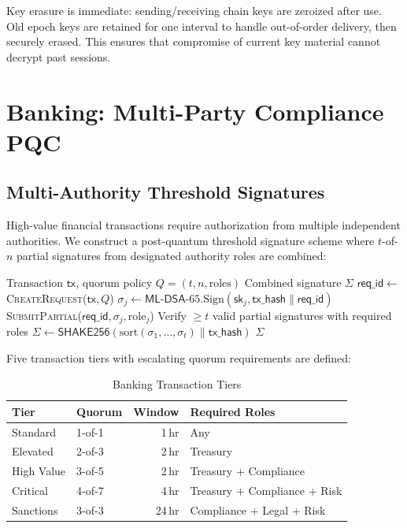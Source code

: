 \documentclass[conference,10pt]{IEEEtran}
\newcommand{\mldsa}{\textsf{ML-DSA}}
\newcommand{\shake}{\textsf{SHAKE256}}
\begin{document}
Key erasure is immediate: sending/receiving chain keys are zeroized after use. Old epoch keys are retained for one interval to handle out-of-order delivery, then securely erased. This ensures that compromise of current key material cannot decrypt past sessions.

\section{Banking: Multi-Party Compliance PQC}
\label{sec:banking}

\subsection{Multi-Authority Threshold Signatures}

High-value financial transactions require authorization from multiple independent authorities. We construct a post-quantum threshold signature scheme where $t$-of-$n$ partial signatures from designated authority roles are combined:

\begin{algorithm}[t]
\caption{Multi-Authority Threshold Signing}
\label{alg:threshold}
\begin{algorithmic}[1]
\REQUIRE Transaction $\mathsf{tx}$, quorum policy $Q = (t, n, \text{roles})$
\ENSURE Combined signature $\Sigma$
\STATE $\mathsf{req\_id} \leftarrow$ \textsc{CreateRequest}($\mathsf{tx}, Q$)
    \STATE $\sigma_j \leftarrow \mldsa\text{-65.Sign}(\mathsf{sk}_j, \mathsf{tx\_hash} \| \mathsf{req\_id})$
    \STATE \textsc{SubmitPartial}($\mathsf{req\_id}, \sigma_j, \text{role}_j$)
\ENDFOR
\STATE Verify $\geq t$ valid partial signatures with required roles
\STATE $\Sigma \leftarrow \shake{}(\text{sort}(\sigma_1, \ldots, \sigma_t) \| \mathsf{tx\_hash})$
\RETURN $\Sigma$
\end{algorithmic}
\end{algorithm}

Five transaction tiers with escalating quorum requirements are defined:

\begin{table}[t]
\centering
\caption{Banking Transaction Tiers}
\label{tab:tiers}
\begin{tabular}{llrl}
\toprule
\textbf{Tier} & \textbf{Quorum} & \textbf{Window} & \textbf{Required Roles} \\
\midrule
Standard & 1-of-1 & 1\,hr & Any \\
Elevated & 2-of-3 & 2\,hr & Treasury \\
High Value & 3-of-5 & 2\,hr & Treasury + Compliance \\
Critical & 4-of-7 & 4\,hr & Treasury + Compliance + Risk \\
Sanctions & 3-of-3 & 24\,hr & Compliance + Legal + Risk \\
\bottomrule
\end{tabular}
\end{table}
\end{document}
